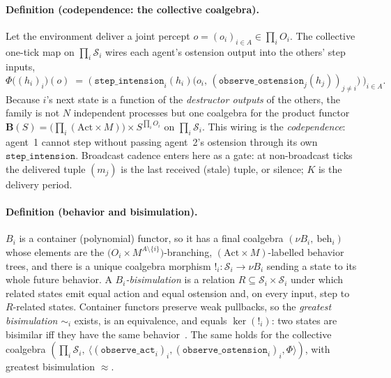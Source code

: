 \documentclass{article}
\newcommand{\method}[1]{\texttt{#1}}
\begin{document}
\paragraph{Definition (codependence: the collective coalgebra).}
Let the environment deliver a joint percept $o=(o_i)_{i\in A}\in\prod_i O_i$.
The collective one-tick map on $\prod_i\mathcal{S}_i$ wires each agent's
ostension output into the others' step inputs,
\[
  \Phi\big((h_i)_i\big)(o)\;=\;
  \Big(\ \method{step\_intension}_i(h_i)\big(o_i,\,(\method{observe\_ostension}_j(h_j))_{j\neq i}\big)\ \Big)_{i\in A}.
\]
Because $i$'s next state is a function of the \emph{destructor outputs} of
the others, the family is not $N$ independent processes but one coalgebra for
the product functor $\mathbf{B}(S)=\big(\prod_i(\mathrm{Act}\times M)\big)\times S^{\prod_i O_i}$
on $\prod_i\mathcal{S}_i$. This wiring is the \emph{codependence}: agent~1
cannot step without passing agent~2's ostension through its own
$\method{step\_intension}$. Broadcast cadence enters here as a gate: at
non-broadcast ticks the delivered tuple $(m_j)$ is the last received (stale)
tuple, or silence; $K$ is the delivery period.

\paragraph{Definition (behavior and bisimulation).}
$B_i$ is a container (polynomial) functor, so it has a final coalgebra
$(\nu B_i,\ \mathrm{beh}_i)$~\citep{aczel1988nonwellfounded,rutten2000universal} whose elements are the $\big(O_i\times M^{A\setminus\{i\}}\big)$-branching,
$(\mathrm{Act}\times M)$-labelled behavior trees, and there is a unique
coalgebra morphism $!_i:\mathcal{S}_i\to\nu B_i$ sending a state to its whole
future behavior. A \emph{$B_i$-bisimulation} is a relation
$R\subseteq\mathcal{S}_i\times\mathcal{S}_i$ under which related states emit
equal action and equal ostension and, on every input, step to $R$-related
states. Container functors preserve weak pullbacks, so the \emph{greatest
bisimulation} $\sim_i$ exists, is an equivalence, and equals $\ker(!_i)$:
two states are bisimilar iff they have the same behavior~\citep{sangiorgi2011bisimulation}. The same holds for
the collective coalgebra $(\prod_i\mathcal{S}_i,\ \langle(\method{observe\_act}_i)_i,(\method{observe\_ostension}_i)_i,\Phi\rangle)$,
with greatest bisimulation $\approx$.
\end{document}
